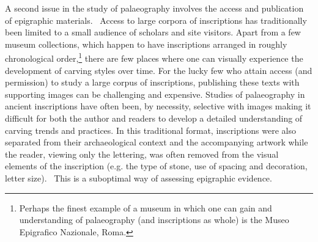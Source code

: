 \documentclass[amsthm,ebook]{saparticle}
\begin{document}
\bigskip

A second issue in the study of palaeography involves the access and publication of epigraphic materials. \ Access to
large corpora of inscriptions has traditionally been limited to a small audience of scholars and site visitors. Apart
from a few museum collections, which happen to have inscriptions arranged in roughly chronological order,\footnote{
Perhaps the finest example of a museum in which one can gain and understanding of palaeography (and inscriptions as
whole) is the Museo Epigrafico Nazionale, Roma. } there are few places where one can visually experience the
development of carving styles over time. For the lucky few who attain access (and permission) to study a large corpus
of inscriptions, publishing these texts with supporting images can be challenging and expensive. Studies of
palaeography in ancient inscriptions have often been, by necessity, selective with images making it difficult for both
the author and readers to develop a detailed understanding of carving trends and practices. In this traditional format,
inscriptions were also separated from their archaeological context and the accompanying artwork while the reader,
viewing only the lettering, was often removed from the visual elements of the inscription (e.g. the type of stone, use
of spacing and decoration, letter size). \ This is a suboptimal way of assessing epigraphic evidence. 


\bigskip
\end{document}
